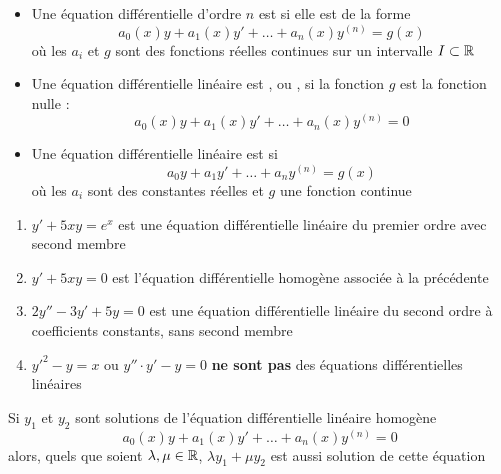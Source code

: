 \begin{frame}

\begin{itemize}
  \item Une équation différentielle d'ordre $n$ est  si elle est de la forme
$$a_0(x)y+a_1(x)y'+\dots +a_n(x)y^{(n)} = g(x)$$
où les $a_i$ et $g$ sont des fonctions réelles continues sur un intervalle $I\subset \mathbb{R}$
\pause
  
  \item Une équation différentielle linéaire est , ou ,
  si la fonction $g$ est la fonction nulle :
  $$a_0(x)y+a_1(x)y'+\dots +a_n(x)y^{(n)} = 0$$
\pause  
  \item Une équation différentielle linéaire est  si
  $$a_0y+a_1y'+\dots +a_ny^{(n)} = g(x)$$
  où les $a_i$ sont des constantes réelles et $g$ une fonction continue
\end{itemize}
\end{frame}


\begin{frame}
\begin{exemple}
\begin{enumerate}
  \item $y' + 5xy = e^x$ est une équation différentielle linéaire du premier ordre avec second membre
\pause  
  \item $y' + 5xy = 0$ est l'équation différentielle homogène associée à la précédente
\pause  
  \item $2y'' - 3y' + 5y = 0$ est une équation différentielle linéaire 
  du second ordre à coefficients constants,
  sans second membre
\pause    
  \item $y'^2 - y = x$ ou $y'' \cdot  y' - y = 0$ \textbf{ne sont pas} 
  des équations différentielles linéaires 
\end{enumerate}
\end{exemple}
\end{frame}



\begin{frame}

\begin{proposition}  
Si $y_1$ et $y_2$ sont solutions de l'équation différentielle linéaire homogène
\begin{equation}
  a_0(x)y+a_1(x)y'+\dots +a_n(x)y^{(n)} = 0
  \label{eq:eqdifflin}
 \tag{$E_0$}
\end{equation}
alors, quels que soient $\lambda,\mu \in \mathbb{R}$, $\lambda y_1 + \mu y_2$ est aussi solution de cette équation
\end{proposition}

\end{frame}


